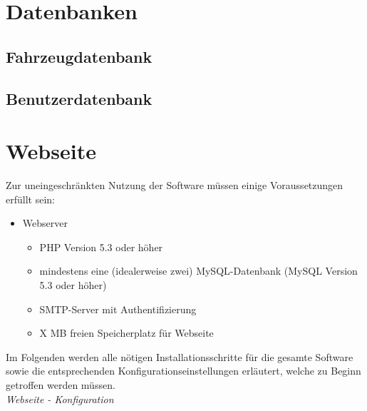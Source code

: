 \documentclass[fontsize = 12pt, paper = a4]{scrreprt}
\begin{document}

\section{Datenbanken}

\subsection{Fahrzeugdatenbank}

\subsection{Benutzerdatenbank}




\newpage


\section{Webseite}

Zur uneingeschränkten Nutzung der Software müssen einige Voraussetzungen erfüllt sein: 

\begin{itemize}

\item Webserver 

\begin{itemize}

\item PHP Version 5.3 oder höher
\item mindestens eine (idealerweise zwei) MySQL-Datenbank (MySQL Version 5.3 oder höher)
\item SMTP-Server mit Authentifizierung
\item X MB freien Speicherplatz für Webseite

\end{itemize}

\end{itemize}

Im Folgenden werden alle nötigen Installationsschritte für die gesamte Software sowie die entsprechenden Konfigurationseinstellungen erläutert, welche zu Beginn getroffen werden müssen. \\

\textit{Webseite - Konfiguration} \\
\end{document}
